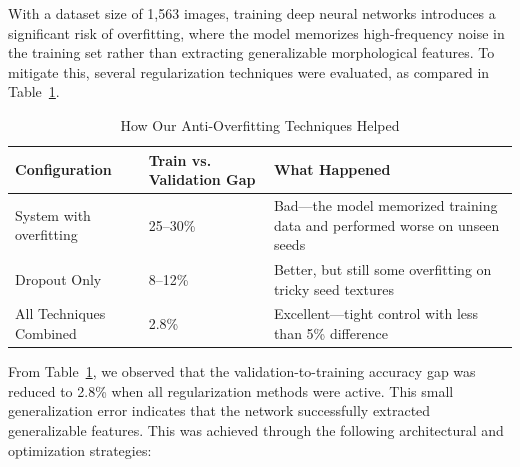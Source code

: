 With a dataset size of 1,563 images, training deep neural networks introduces a significant risk of overfitting, where the model memorizes high-frequency noise in the training set rather than extracting generalizable morphological features. To mitigate this, several regularization techniques were evaluated, as compared in Table~\ref{tab:regularization}.

\begin{table}[htbp]
  \centering
  \caption{How Our Anti-Overfitting Techniques Helped}
  \label{tab:regularization}
  \small
  \renewcommand{\arraystretch}{1.1}
  \begin{tabularx}{\textwidth}{|p{4.2cm}|p{4.8cm}|X|}
    \hline
    \textbf{Configuration} & \textbf{Train vs. Validation Gap} & \textbf{What Happened} \\
    \hline
    System with overfitting & 25--30\% & Bad---the model memorized training data and performed worse on unseen seeds \\
    \hline
    Dropout Only & 8--12\% & Better, but still some overfitting on tricky seed textures \\
    \hline
    All Techniques Combined & 2.8\% & Excellent---tight control with less than 5\% difference \\
    \hline
  \end{tabularx}
\end{table}

From Table~\ref{tab:regularization}, we observed that the validation-to-training accuracy gap was reduced to 2.8\% when all regularization methods were active. This small generalization error indicates that the network successfully extracted generalizable features. This was achieved through the following architectural and optimization strategies:

